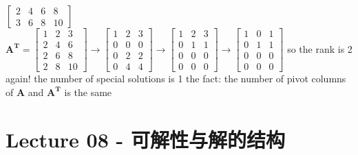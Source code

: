 \documentclass[12pt, a4paper]{article}
\begin{document}
{\begin{math}
\begin{bmatrix}
		2 & 4 & 6 & 8 \\
		3 & 6 & 8 & 10
	\end{bmatrix}
\end{math}
\newline
\begin{math}
	{\mathbf{A^{T}}} = 
	\begin{bmatrix}
		1 & 2 & 3 \\
		2 & 4 & 6 \\
		2 & 6 & 8 \\
		2 & 8 & 10
	\end{bmatrix}
	\longrightarrow
	\begin{bmatrix}
		1 & 2 & 3 \\
		0 & 0 & 0 \\
		0 & 2 & 2 \\
		0 & 4 & 4
	\end{bmatrix}
	\longrightarrow
	\begin{bmatrix}
		1 & 2 & 3 \\
		0 & 1 & 1 \\
		0 & 0 & 0 \\
		0 & 0 & 0
	\end{bmatrix}
	\longrightarrow
	\begin{bmatrix}
		1 & 0 & 1 \\
		0 & 1 & 1 \\
		0 & 0 & 0 \\
		0 & 0 & 0
	\end{bmatrix}
\end{math}
\newline
so the rank is 2 again!
\newline
the number of special solutions is 1
\vspace{14pt}
\newline
{\textcolor{anhao-scarlet}{the fact: the number of pivot columns of ${\mathbf{A}}$ and ${\mathbf{A^{T}}}$ is the same}}

\newpage
\section{Lecture 08 - 可解性与解的结构}
\pagestyle{fancy}
\lhead{}
\rhead{}

}
\end{document}
